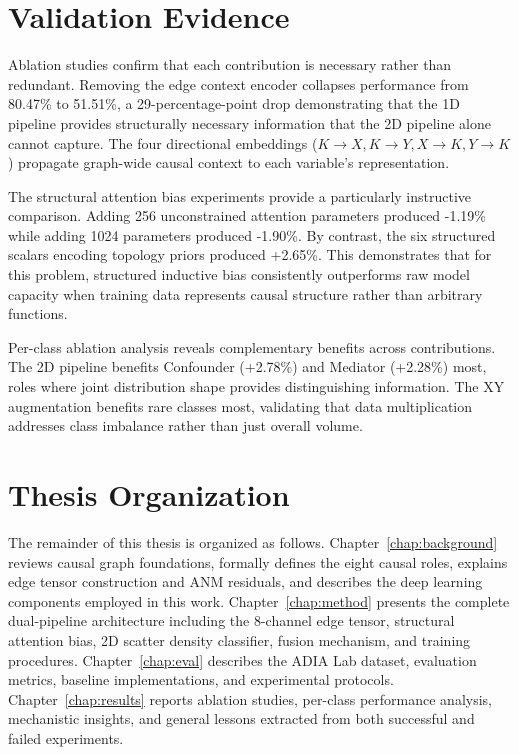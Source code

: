 \section{Validation Evidence}
\label{sec:validation}

Ablation studies confirm that each contribution is necessary rather than redundant. Removing the edge context encoder collapses performance from 80.47\% to 51.51\%, a 29-percentage-point drop demonstrating that the 1D pipeline provides structurally necessary information that the 2D pipeline alone cannot capture. The four directional embeddings ($K\to X, K\to Y, X\to K, Y\to K$) propagate graph-wide causal context to each variable's representation.

The structural attention bias experiments provide a particularly instructive comparison. Adding 256 unconstrained attention parameters produced -1.19\% while adding 1024 parameters produced -1.90\%. By contrast, the six structured scalars encoding topology priors produced +2.65\%. This demonstrates that for this problem, structured inductive bias consistently outperforms raw model capacity when training data represents causal structure rather than arbitrary functions.

Per-class ablation analysis reveals complementary benefits across contributions. The 2D pipeline benefits Confounder (+2.78\%) and Mediator (+2.28\%) most, roles where joint distribution shape provides distinguishing information. The XY augmentation benefits rare classes most, validating that data multiplication addresses class imbalance rather than just overall volume.

\section{Thesis Organization}
\label{sec:organization}

The remainder of this thesis is organized as follows. Chapter~\ref{chap:background} reviews causal graph foundations, formally defines the eight causal roles, explains edge tensor construction and ANM residuals, and describes the deep learning components employed in this work. Chapter~\ref{chap:method} presents the complete dual-pipeline architecture including the 8-channel edge tensor, structural attention bias, 2D scatter density classifier, fusion mechanism, and training procedures. Chapter~\ref{chap:eval} describes the ADIA Lab dataset, evaluation metrics, baseline implementations, and experimental protocols. Chapter~\ref{chap:results} reports ablation studies, per-class performance analysis, mechanistic insights, and general lessons extracted from both successful and failed experiments.
